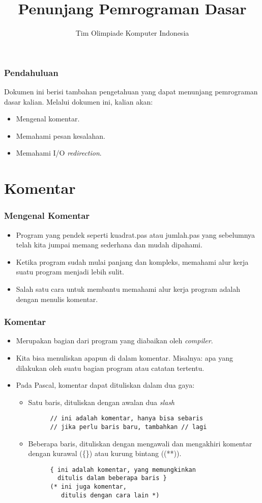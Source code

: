 \documentclass{beamer}
\title{Penunjang Pemrograman Dasar}
\author{Tim Olimpiade Komputer Indonesia}
\date{}
\begin{document}
\begin{frame}
\titlepage
\end{frame}

\begin{frame}
\frametitle{Pendahuluan}
Dokumen ini berisi tambahan pengetahuan yang dapat menunjang pemrograman dasar kalian.
\vfill
Melalui dokumen ini, kalian akan:
\begin{itemize}
  \item Mengenal komentar.
  \item Memahami pesan kesalahan.
  \item Memahami I/O \textit{redirection}.
\end{itemize}
\end{frame}

\section{Komentar}
\frame{\sectionpage}

\begin{frame}
\frametitle{Mengenal Komentar}
\begin{itemize}
  \item Program yang pendek seperti kuadrat.pas atau jumlah.pas yang sebelumnya telah kita jumpai memang sederhana dan mudah dipahami.
  \item Ketika program sudah mulai panjang dan kompleks, memahami alur kerja suatu program menjadi lebih sulit.
  \item Salah satu cara untuk membantu memahami alur kerja program adalah dengan menulis komentar.
\end{itemize}
\end{frame}

\begin{frame}[fragile]
\frametitle{Komentar}
\begin{itemize}
  \item Merupakan bagian dari program yang diabaikan oleh \textit{compiler}.
  \item Kita bisa menuliskan apapun di dalam komentar. Misalnya: apa yang dilakukan oleh suatu bagian program atau catatan tertentu.
  \item Pada Pascal, komentar dapat dituliskan dalam dua gaya:
  \begin{itemize}
    \item Satu baris, dituliskan dengan awalan dua \textit{slash}
    \begin{lstlisting}
      // ini adalah komentar, hanya bisa sebaris
      // jika perlu baris baru, tambahkan // lagi
    \end{lstlisting}
    \item Beberapa baris, dituliskan dengan mengawali dan mengakhiri komentar dengan kurawal (\{\}) atau kurung bintang ((**)).
    \begin{lstlisting}
      { ini adalah komentar, yang memungkinkan
        ditulis dalam beberapa baris }
      (* ini juga komentar,
         ditulis dengan cara lain *)
    \end{lstlisting}
  \end{itemize}
\end{itemize}
\end{frame}
\end{document}

